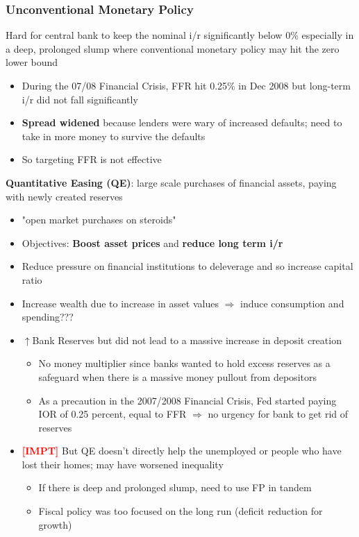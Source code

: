 \documentclass{article}
\newcommand{\impt}[0]{\textcolor{red}{\textbf{[IMPT] }}}
\begin{document}
\begin{multicols}{2}
\subsubsection{Unconventional Monetary Policy}
Hard for central bank to keep the nominal i/r significantly below 0\% especially in a deep, prolonged slump where conventional monetary policy may hit the zero lower bound
\begin{itemize}
	\item During the 07/08 Financial Crisis, FFR hit 0.25\% in Dec 2008 but long-term i/r did not fall significantly
	\item \textbf{Spread widened} because lenders were wary of increased defaults; need to take in more money to survive the defaults
	\item So targeting FFR is not effective
\end{itemize}
\textbf{Quantitative Easing (QE)}: large scale purchases of financial assets, paying with newly created reserves
\begin{itemize}
	\item "open market purchases on steroids"
	\item Objectives: \textbf{Boost asset prices} and \textbf{reduce long term i/r}
	\item Reduce pressure on financial institutions to deleverage and so increase capital ratio
	\item Increase wealth due to increase in asset values $\Rightarrow$ induce consumption and spending???
	\item $\uparrow$Bank Reserves but did not lead to a massive increase in deposit creation
	\begin{itemize}
		\item No money multiplier since banks wanted to hold excess reserves as a safeguard when there is a massive money pullout from depositors
		\item As a precaution in the 2007/2008 Financial Crisis, Fed started paying IOR of 0.25 percent, equal to FFR $\Rightarrow$ no urgency for bank to get rid of reserves
	\end{itemize}
    \item \impt But QE doesn't directly help the unemployed or people who have lost their homes; may have worsened inequality
    \begin{itemize}
    	\item If there is deep and prolonged slump, need to use FP in tandem
    	\item Fiscal policy was too focused on the long run (deficit reduction for growth)

\end{itemize}
\end{itemize}
\end{multicols}
\end{document}
